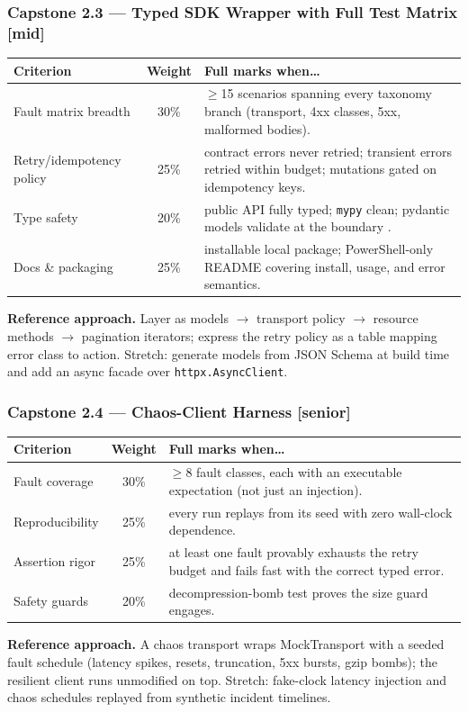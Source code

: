 \subsubsection*{Capstone 2.3 --- Typed SDK Wrapper with Full Test Matrix [mid]}
\begin{center}\small
\begin{tabularx}{\textwidth}{l c X}
\toprule
\textbf{Criterion} & \textbf{Weight} & \textbf{Full marks when\ldots} \\
\midrule
Fault matrix breadth & 30\% & $\geq$15 scenarios spanning every taxonomy branch (transport, 4xx classes, 5xx, malformed bodies). \\
Retry/idempotency policy & 25\% & contract errors never retried; transient errors retried within budget; mutations gated on idempotency keys. \\
Type safety & 20\% & public API fully typed; \texttt{mypy} clean; pydantic models validate at the boundary \cite{pydanticdocs}. \\
Docs \& packaging & 25\% & installable local package; PowerShell-only README covering install, usage, and error semantics. \\
\bottomrule
\end{tabularx}
\end{center}
\textbf{Reference approach.} Layer as models $\to$ transport policy $\to$
resource methods $\to$ pagination iterators; express the retry policy as a
table mapping error class to action. Stretch: generate models from JSON
Schema at build time and add an async facade over \texttt{httpx.AsyncClient}.

\subsubsection*{Capstone 2.4 --- Chaos-Client Harness [senior]}
\begin{center}\small
\begin{tabularx}{\textwidth}{l c X}
\toprule
\textbf{Criterion} & \textbf{Weight} & \textbf{Full marks when\ldots} \\
\midrule
Fault coverage & 30\% & $\geq$8 fault classes, each with an executable expectation (not just an injection). \\
Reproducibility & 25\% & every run replays from its seed with zero wall-clock dependence. \\
Assertion rigor & 25\% & at least one fault provably exhausts the retry budget and fails fast with the correct typed error. \\
Safety guards & 20\% & decompression-bomb test proves the size guard engages. \\
\bottomrule
\end{tabularx}
\end{center}
\textbf{Reference approach.} A chaos transport wraps MockTransport with a
seeded fault schedule (latency spikes, resets, truncation, 5xx bursts,
gzip bombs); the resilient client runs unmodified on top. Stretch: fake-clock
latency injection and chaos schedules replayed from synthetic incident
timelines.

